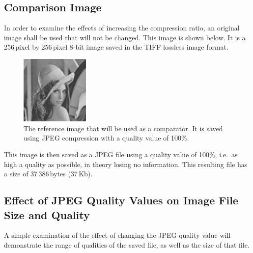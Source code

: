 \subsection{Comparison Image} %
\label{sub:comparison_image}
In order to examine the effects of increasing the compression ratio, an original image shall be used that will not be changed. This image is shown below. It is a 256\,pixel by 256\,pixel 8-bit image saved in the TIFF lossless image format.
\begin{figure}[ht]
 	\centering
 	\includegraphics[width=0.3\textwidth]{lena.jpg}
	\caption{The reference image that will be used as a comparator. It is saved using JPEG compression with a quality value of 100\%.\label{fig:orig}}
\end{figure}
This image is then saved as a JPEG file using a quality value of 100\%, i.e.\ as high a quality as possible, in theory losing no information. This resulting file has a size of 37\,386\,bytes (37\,Kb). 

\subsection{Effect of JPEG Quality Values on Image File Size and Quality} %
\label{sub:effect_of_jpeg_quality_values_on_image_file_size_and_quality}
A simple examination of the effect of changing the JPEG quality value will demonstrate the range of qualities of the saved file, as well as the size of that file.

